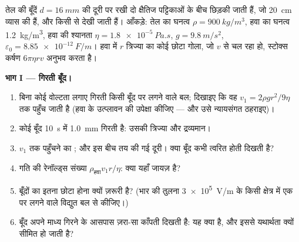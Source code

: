 \begin{problem}
\label{pb:b1:potential-capacitors:1}
तेल की बूँदें $d = \qty{16}{mm}$ की दूरी पर रखी दो क्षैतिज पट्टिकाओं के बीच
छिड़की जाती हैं, जो \qty{20}{cm} व्यास की हैं, और किसी  से
देखी जाती हैं। आँकड़े: तेल का घनत्व $\rho = \qty{900}{kg/m^3}$, हवा का घनत्व
\qty{1.2}{kg/m^3}, हवा की श्यानता $\eta = \qty{1.8e-5}{Pa.s}$, $g =
\qty{9.8}{m/s^2}$, $\varepsilon_0 = \qty{8.85e-12}{F/m}$। हवा में
$r$ त्रिज्या का कोई छोटा गोला, जो $v$ से चल रहा हो, स्टोक्स कर्षण $6\pi\eta rv$ अनुभव करता है।

\medskip
\noindent\textbf{भाग I --- गिरती बूँद।}
\begin{enumerate}
  \item बिना कोई वोल्टता लगाए गिरती किसी बूँद पर लगने वाले बल; दिखाइए कि
        वह  $v_1 = 2\rho gr^2/9\eta$ तक पहुँच जाती है (हवा के
        उत्प्लावन की उपेक्षा कीजिए --- और उसे न्यायसंगत ठहराइए)।
  \item कोई बूँद \qty{10}{s} में \qty{1.0}{mm} गिरती है: उसकी त्रिज्या और
        द्रव्यमान।
  \item $v_1$ तक पहुँचने का ; और इस बीच तय की गई दूरी। क्या बूँद कभी
        त्वरित होती दिखती है?
  \item गति की रेनॉल्ड्स संख्या $\rho_{\text{हवा}}v_1r/\eta$: क्या  यहाँ जायज़ है?
  \item बूँदों का इतना छोटा होना क्यों ज़रूरी है? (भार की तुलना
        \qty{3e5}{V/m} के किसी क्षेत्र में एक  पर लगने वाले विद्युत
        बल से कीजिए।)
  \item बूँद अपने माध्य गिरने के आसपास ज़रा-सा काँपती दिखती है: यह क्या है,
        और इससे यथार्थता क्यों सीमित हो जाती है?
\end{enumerate}


\end{problem}

